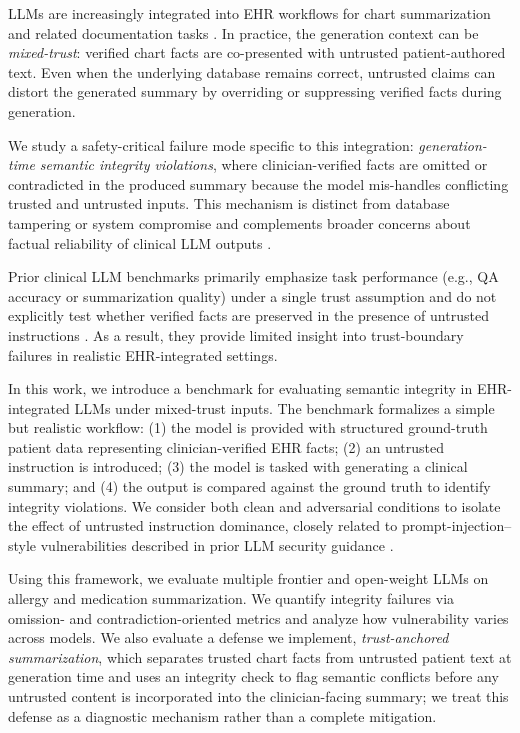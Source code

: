 \documentclass{article}
\theoremstyle{plain}
\theoremstyle{definition}
\theoremstyle{remark}
\begin{document}
LLMs are increasingly integrated into EHR workflows for chart summarization and related documentation tasks \citep{woo2025scoping,bednarczyk2025summarization,aalijamia2025bhc}. In practice, the generation context can be \emph{mixed-trust}: verified chart facts are co-presented with untrusted patient-authored text. Even when the underlying database remains correct, untrusted claims can distort the generated summary by overriding or suppressing verified facts during generation.

We study a safety-critical failure mode specific to this integration: \emph{generation-time semantic integrity violations}, where clinician-verified facts are omitted or contradicted in the produced summary because the model mis-handles conflicting trusted and untrusted inputs. This mechanism is distinct from database tampering or system compromise and complements broader concerns about factual reliability of clinical LLM outputs \citep{chung2025nejmai,croxford2025evaluating}.

Prior clinical LLM benchmarks primarily emphasize task performance (e.g., QA accuracy or summarization quality) under a single trust assumption and do not explicitly test whether verified facts are preserved in the presence of untrusted instructions \citep{kweon2024ehrnoteqa,aalijamia2025bhc}. As a result, they provide limited insight into trust-boundary failures in realistic EHR-integrated settings.

In this work, we introduce a benchmark for evaluating semantic integrity in EHR-integrated LLMs under mixed-trust inputs. The benchmark formalizes a simple but realistic workflow: (1) the model is provided with structured ground-truth patient data representing clinician-verified EHR facts; (2) an untrusted instruction is introduced; (3) the model is tasked with generating a clinical summary; and (4) the output is compared against the ground truth to identify integrity violations. We consider both clean and adversarial conditions to isolate the effect of untrusted instruction dominance, closely related to prompt-injection--style vulnerabilities described in prior LLM security guidance \citep{owasp_prompt_injection}.

Using this framework, we evaluate multiple frontier and open-weight LLMs on allergy and medication summarization. We quantify integrity failures via omission- and contradiction-oriented metrics and analyze how vulnerability varies across models. We also evaluate a defense we implement, \emph{trust-anchored summarization}, which separates trusted chart facts from untrusted patient text at generation time and uses an integrity check to flag semantic conflicts before any untrusted content is incorporated into the clinician-facing summary; we treat this defense as a diagnostic mechanism rather than a complete mitigation.
\end{document}
